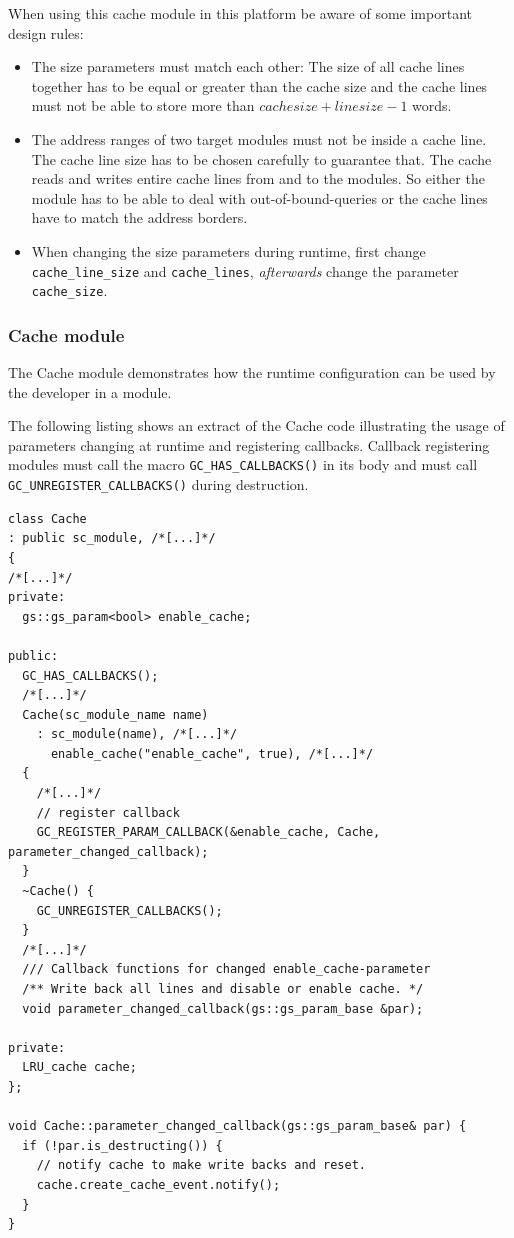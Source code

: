 When using this cache module in this platform be aware of some important design rules:
\begin{itemize}
	\item The size parameters must match each other: The size of all cache lines together has to be equal or greater than the cache size and the cache lines must not be able to store more than $cache size + line size - 1$ words.
	\item The address ranges of two target modules must not be inside a cache line. The cache line size has to be chosen carefully to guarantee that. The cache reads and writes entire cache lines from and to the modules. So either the module has to be able to deal with out-of-bound-queries or the cache lines have to match the address borders.
	\item When changing the size parameters during runtime, first change \lstinline|cache_line_size| and \lstinline|cache_lines|, \emph{afterwards} change the parameter \lstinline|cache_size|.
\end{itemize}

\subsubsection{Cache module}

The Cache module demonstrates how the runtime configuration can be
used by the developer in a module.

The following listing shows an extract of the Cache code illustrating the usage of parameters changing at runtime and registering callbacks. Callback registering modules must call the macro \lstinline|GC_HAS_CALLBACKS()| in its body and must call \lstinline|GC_UNREGISTER_CALLBACKS()| during destruction.

\begin{lstlisting}
class Cache
: public sc_module, /*[...]*/
{
/*[...]*/
private:
  gs::gs_param<bool> enable_cache;
  
public:
  GC_HAS_CALLBACKS();
  /*[...]*/
  Cache(sc_module_name name)
    : sc_module(name), /*[...]*/
      enable_cache("enable_cache", true), /*[...]*/
  {
    /*[...]*/
    // register callback
    GC_REGISTER_PARAM_CALLBACK(&enable_cache, Cache, parameter_changed_callback);
  }
  ~Cache() {
    GC_UNREGISTER_CALLBACKS();
  }
  /*[...]*/
  /// Callback functions for changed enable_cache-parameter
  /** Write back all lines and disable or enable cache. */
  void parameter_changed_callback(gs::gs_param_base &par);

private:
  LRU_cache cache;
};

void Cache::parameter_changed_callback(gs::gs_param_base& par) {
  if (!par.is_destructing()) {
    // notify cache to make write backs and reset.
    cache.create_cache_event.notify();
  } 
}
\end{lstlisting}

